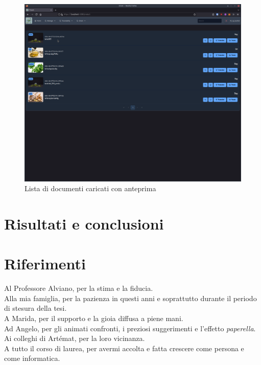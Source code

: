 \documentclass[a4paper,11pt]{article}
\begin{document}
\begin{figure}[H]
  \centering
  \includegraphics[width=0.5\linewidth]{screenIotChain/0013.png}
  \caption{Lista di documenti caricati con anteprima}
  \label{fig:screen13}
\end{figure}



\clearpage
\section{Risultati e conclusioni}

\clearpage
\section{Riferimenti}
\listoffigures
\clearpage
\listoftables
\clearpage
\renewcommand\listoflistingscaption{Elenco del codice sorgente}
\listoflistings %
\clearpage
\printbibliography
\clearpage
{}
\centering
\vspace*{\fill}
Al Professore Alviano, per la stima e la fiducia.
\\
Alla mia famiglia, per la pazienza in questi anni e soprattutto durante il periodo di stesura della tesi.
\\
A Marida, per il supporto e la gioia diffusa a piene mani.
\\
Ad Angelo, per gli animati confronti, i preziosi suggerimenti e l’effetto \textit{paperella}.
\\
Ai colleghi di Artémat, per la loro vicinanza.
\\
A tutto il corso di laurea, per avermi accolta e fatta crescere come persona e come informatica.
\vspace*{\fill}
\end{document}
